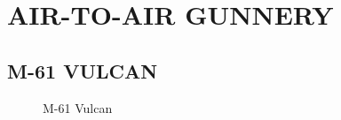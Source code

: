 \section{AIR-TO-AIR GUNNERY}

\subsection{M-61 VULCAN}
\label{subsec:m61}

\begin{figure}[htbp]
    \centering
    \caption{M-61 Vulcan}
\end{figure}

